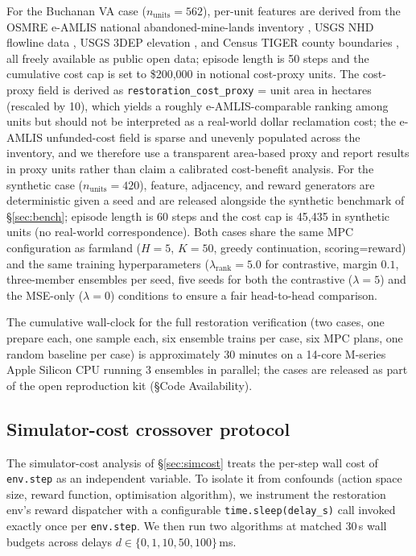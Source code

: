 \documentclass[11pt]{article}
\begin{document}
For the Buchanan VA case ($n_{\text{units}}=562$), per-unit features are derived from the OSMRE e-AMLIS national abandoned-mine-lands inventory \citep{osmre2019eamlis}, USGS NHD flowline data \citep{usgs2024nhd}, USGS 3DEP elevation \citep{usgs2024_3dep}, and Census TIGER county boundaries \citep{census2023tiger}, all freely available as public open data; episode length is 50 steps and the cumulative cost cap is set to \$200{,}000 in notional cost-proxy units. The cost-proxy field is derived as \texttt{restoration\_cost\_proxy} = unit area in hectares (rescaled by 10), which yields a roughly e-AMLIS-comparable ranking among units but should not be interpreted as a real-world dollar reclamation cost; the e-AMLIS unfunded-cost field is sparse and unevenly populated across the inventory, and we therefore use a transparent area-based proxy and report results in proxy units rather than claim a calibrated cost-benefit analysis. For the synthetic case ($n_{\text{units}}=420$), feature, adjacency, and reward generators are deterministic given a seed and are released alongside the synthetic benchmark of \S\ref{sec:bench}; episode length is 60 steps and the cost cap is 45{,}435 in synthetic units (no real-world correspondence). Both cases share the same MPC configuration as farmland ($H{=}5$, $K{=}50$, greedy continuation, scoring=reward) and the same training hyperparameters ($\lambda_{\text{rank}}{=}5.0$ for contrastive, margin $0.1$, three-member ensembles per seed, five seeds for both the contrastive ($\lambda{=}5$) and the MSE-only ($\lambda{=}0$) conditions to ensure a fair head-to-head comparison.

The cumulative wall-clock for the full restoration verification (two cases, one prepare each, one sample each, six ensemble trains per case, six MPC plans, one random baseline per case) is approximately 30 minutes on a 14-core M-series Apple Silicon CPU running 3 ensembles in parallel; the cases are released as part of the open reproduction kit (\S Code Availability).

\subsection*{Simulator-cost crossover protocol}\label{sec:methods-simcost}

The simulator-cost analysis of \S\ref{sec:simcost} treats the per-step wall cost of \texttt{env.step} as an independent variable. To isolate it from confounds (action space size, reward function, optimisation algorithm), we instrument the restoration env's reward dispatcher with a configurable \texttt{time.sleep(delay\_s)} call invoked exactly once per \texttt{env.step}. We then run two algorithms at matched 30\,s wall budgets across delays $d \in \{0, 1, 10, 50, 100\}$\,ms.
\end{document}
